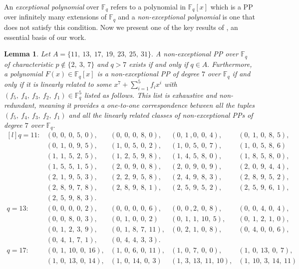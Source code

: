 \documentclass[12pt,a4wide, reqno]{amsart}
\newtheorem{lemma}{Lemma}
\theoremstyle{definition}
\theoremstyle{remark}
\numberwithin{equation}{section}
\begin{document}
An \textit{exceptional polynomial} over $\mathbb{F}_q$ refers to a polynomial in $\mathbb{F}_q[x]$ which is a PP over infinitely many extensions of $\mathbb{F}_q$ and a \textit{non-exceptional polynomial} is one that does not satisfy this condition.
Now we present one of the key results of \cite{xfan}, an essential basis of our work.
\begin{lemma}\cite[Theorem~13]{xfan}\label{l4}
    Let $A=\{11,~13,~17,~19,~23,~25,~31\}.$ A non-exceptional PP over $\mathbb{F}_q$ of characteristic $p\notin\{2,~3,~7\}$ and $q>7$ exists if and only if $q\in A.$ Furthermore, a polynomial $F(x)\in\mathbb{F}_q[x]$ is a non-exceptional PP of degree $7$ over $\mathbb{F}_q$ if and only if it is linearly related to some $x^7+\sum_{i=1}^{5}f_ix^i$ with $(f_5,~f_4,~f_3,~f_2,~f_1)\in \mathbb{F}_q^5$ listed as follows. This list is exhaustive and non-redundant, meaning it provides a one-to-one correspondence between all the tuples $(f_5,~f_4,~f_3,~f_2,~f_1)$ and all the linearly related classes of non-exceptional PPs of degree $7$ over $\mathbb{F}_q.$
   \begin{displaymath}
 \begin{matrix*}[l]
 q=11:& (0,~0,~0,~5,~0),&(0,~0,~0,~8,~0),& (0,~1~,0,~0,~4),&(0,~1,~0,~8,~5), \\
 &(0,~1,~0,~9,~5),& (1,~0,~5,~0,~2),&(1,~0,~5,~0,~7),&(1,~0,~5,~8,~6)\\
 &(1,~1,~5,~2,~5),&(1,~2,~5,~9,~8),& (1,~4,~5,~8,~0),&(1,~8,~5,~8,~0),\\
 &(1,~5,~5,~1,~5),&(2,~0,~9,~0,~8),& (2,~0,~9,~0,~9),& (2,~0,~9,~4,~4),\\
 &(2,~1,~9,~5,~3),& (2,~2,~9,~5,~8),&(2,~4,~9,~8,~3),&(2,~8,~9,~5,~2), \\
&(2,~8,~9,~7,~8),&(2,~8,~9,~8,~1), &(2,~5,~9,~5,~2),& (2,~5,~9,~6,~1),\\
&(2,~5,~9,~8,~3).& & & \\
q=13:& (0,~0,~0,~0,~2), &(0,~0,~0,~0,~6), & (0,~0~,2,~0,~8),&(0,~0,~4,~0,~4),\\ & (0,~0,~8,~0,~3),& (0,~1,~0,~0,~2) &(0,~1,~1,~10,~5),&(0,~1,~2,~1,~0),\\
& (0,~1,~2,~3,~9), &(0,~1,~8,~7,~11),& (0,~2,~1,~0,~8), &(0,~4,~0,~0,~6),\\
& (0,~4,~1,~7,~1), &(0,~4,~4,~3,~3). & &  \\
q=17:& (0,~1,~10,~0,~16), &(1,~0,~6,~0,~11), & (1,~0,~7,~0,~0),&(1,~0,~13,~0,~7),\\
& (1,~0,~13,~0,~14),& (1,~0,~14,~0,~3) &(1,~3,~13,~11,~10),&(1,~10,~3,~14,~11)\\

\end{matrix*}
\end{displaymath}
\end{lemma}
\end{document}
